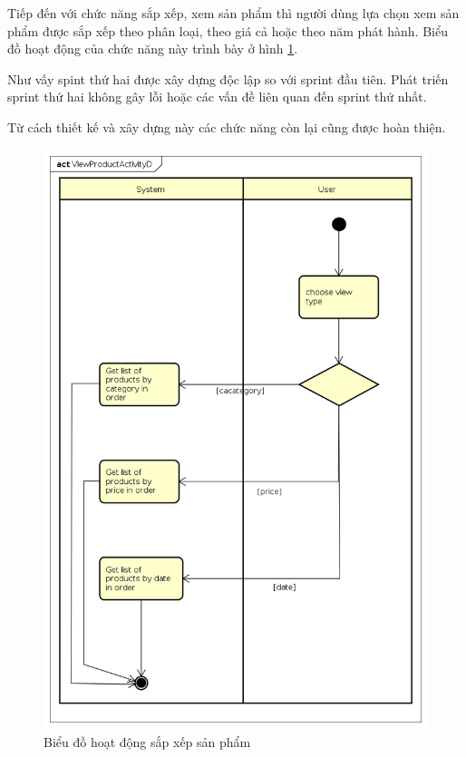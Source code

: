 \documentclass{article}
\begin{document}
Tiếp đến với chức năng sắp xếp, xem sản phẩm thì người dùng lựa chọn xem sản phẩm được sắp xếp theo phân loại, theo giá cả hoặc theo năm phát hành. Biểu đồ hoạt động của chức năng này trình bày ở hình \ref{fig:actview}.

Như vấy spint thứ hai được xây dựng độc lập so với sprint đầu tiên. Phát triến sprint thứ hai không gây lỗi hoặc các vấn đề liên quan đến sprint thứ nhất. 

Từ cách thiết kế và xây dựng này các chức năng còn lại cũng được hoàn thiện. 

\begin{figure}[h]
	\centering
	\includegraphics[scale=0.3]{figures/actview.png}
	\caption{Biểu đồ hoạt động sắp xếp sản phẩm}
	\label{fig:actview}
\end{figure}
\end{document}
